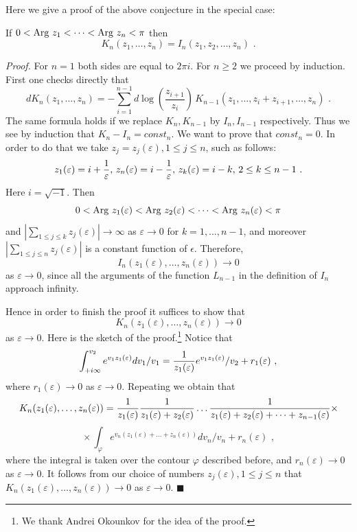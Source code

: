 \documentclass[12pt]{article}
\begin{document}
Here we give a proof of the above conjecture in the special case:

\begin{prp} If $0<\operatorname{Arg}\,z_1<\dots<\operatorname{Arg}\,z_n<\pi$ then
$$K_n(z_1,\dots,z_n)=I_n(z_1,z_2,\dots,z_n)\,\,.$$


\end{prp}



{\it Proof.} For $n=1$ both sides are equal to $2\pi i$. For $n\geqslant 2$ we proceed by induction.
First one checks directly that
$$dK_n(z_1,\dots,z_n)=-\sum_{i=1}^{n-1}d\log\left(\frac{z_{i+1}}{z_i}\right)\, K_{n-1}(z_1,\dots, z_i+z_{i+1},\dots,z_n)\,\,.$$
The same formula holds if we replace $K_n,K_{n-1}$ by $I_n,I_{n-1}$ respectively. Thus we see by induction that
$K_n-I_n=const_n$. We want to prove that $const_n=0$. In order to do that we take $z_j=z_j(\varepsilon), 1\le j\le n$,
such as follows: 
$$z_1(\varepsilon)=i+{1\over {\varepsilon}},\, z_n(\varepsilon)=i-{1\over {\varepsilon}},\,z_k(\varepsilon)=i-k, \,
2\le k\le n-1\,\,.$$ Here $i=\sqrt{-1}$. Then 
$$0<\operatorname{Arg}\,z_1(\varepsilon)<\operatorname{Arg}\,z_2(\varepsilon)<\dots<\operatorname{Arg}\,z_n(\varepsilon)<\pi$$ and
$|\sum_{1\le j\le k}z_j(\varepsilon)|\to \infty$ as $\varepsilon\to 0$ for $k=1,\dots,n-1$, and moreover $|\sum_{1\le j\le n}z_j(\varepsilon)|$ is a constant function of $\epsilon$. Therefore, $$I_n(z_1(\varepsilon),\dots, z_n(\varepsilon))\to 0$$ as $\varepsilon\to 0$,
since all the arguments of the function $L_{n-1}$ in the definition of $I_n$ approach infinity.

Hence in order to finish the proof it suffices to show that 
$$K_n(z_1(\varepsilon),\dots, z_n(\varepsilon))\to 0$$ as $\varepsilon\to 0$.
Here is the sketch of the proof.\footnote{We thank Andrei Okounkov for the idea of the proof.}
Notice that $$\int_{+i\infty}^{v_2}e^{v_1z_1(\varepsilon)}dv_1/v_1={1\over{z_1(\varepsilon)}}e^{v_1z_1(\varepsilon)}/v_2+
r_1(\varepsilon)\,\,,$$ where $r_1(\varepsilon)\to 0$ as $\varepsilon\to 0$. Repeating we obtain that
$$K_n(z_1(\varepsilon),\dots, z_n(\varepsilon))={1\over{z_1(\varepsilon)}}
{1\over{z_1(\varepsilon)+z_2(\varepsilon)}}\dots{1\over{z_1(\varepsilon)+z_2(\varepsilon)+\dots+z_{n-1}(\varepsilon)}}\times$$
$${}\times\int_{\varphi}e^{v_n(z_1(\varepsilon)+\dots+z_n(\varepsilon))}dv_n/v_n+r_n(\varepsilon)\,\,,$$
where the integral is taken over the contour $\varphi$ described before, and $r_n(\varepsilon)\to 0$ as $\varepsilon\to 0$.
It follows from our choice of numbers $z_j(\varepsilon), 1\le j\le n$ that
$K_n(z_1(\varepsilon),\dots, z_n(\varepsilon))\to 0$ as $\varepsilon\to 0$. $\blacksquare$
\end{document}
